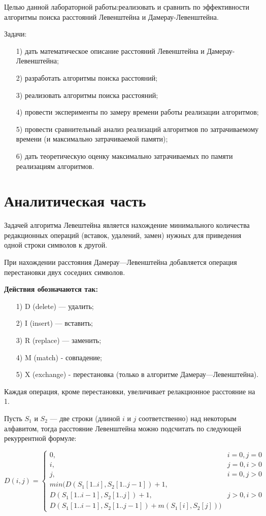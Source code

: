 \documentclass[12pt]{report}
\begin{document}
	Целью данной лабораторной работы:реализовать и сравнить по эффективности алгоритмы поиска расстояний Левенштейна и Дамерау-Левенштейна.
	
	Задачи:
	\begin{enumerate}
		\item[1)] дать математическое описание расстояний Левенштейна и Дамерау-Левенштейна;
		\item[2)] разработать алгоритмы поиска расстояний;
		\item[3)] реализовать алгоритмы поиска расстояний;
		\item[4)] провести эксперименты по замеру времени работы реализации алгоритмов;
		\item[5)] провести сравнительный анализ реализаций алгоритмов по затрачиваемому времени (и максимально затрачиваемой памяти);
		\item[6)] дать теоретическую оценку максимально затрачиваемых по памяти реализациям алгоритмов.
	\end{enumerate}
	
	\chapter{Аналитическая часть} 
	Задачей алгоритма Левештейна является нахождение минимального количества редакционных операций (вставок, удалений, замен) нужных для приведения одной строки символов к другой.
	
	При нахождении расстояния Дамерау—Левенштейна добавляется операция перестановки двух соседних символов. 
	
	\textbf{Действия обозначаются так:} 
	\begin{enumerate}
		\item[1)] D (delete) — удалить;
		\item[2)] I (insert) — вставить;
		\item[3)] R (replace) — заменить;
		\item[4)] M (match) - совпадение;
		\item[5)] X (exchange) - перестановка (только в алгоритме Дамерау—Левенштейна).
	\end{enumerate}
Каждая операция, кроме перестановки, увеличивает релакционное расстояние на 1.


Пусть $S_{1}$ и $S_{2}$ — две строки (длиной $i$ и $j$ соответственно) над некоторым алфавитом, тогда расстояние Левенштейна можно подсчитать по следующей рекуррентной формуле:


\begin{equation}
	D(i,j) = \left\{ \begin{array}{ll}
		0, & \textrm{$i = 0, j = 0$}\\
		i, & \textrm{$j = 0, i > 0$}\\
		j, & \textrm{$i = 0, j > 0$}\\
		min(D(S_{1}[1..i],S_{2}[1..j-1])+1,\\
		D(S_{1}[1..i-1],S_{2}[1..j]) +1, &\textrm{$j>0, i>0$}\\
		D(S_{1}[1..i-1],S_{2}[1..j-1]) + m(S_{1}[i], S_{2}[j]))
	\end{array}\right.
\end{equation}
\end{document}
